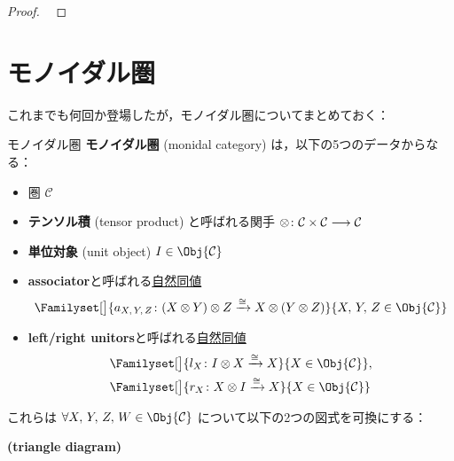 \documentclass[TQFT_main]{subfiles}
\begin{document}
    \begin{proof}
        ~\cite[Proposition 2.1, p.5]{Mueger1998}
    \end{proof}

    \section{モノイダル圏}

    これまでも何回か登場したが，モノイダル圏についてまとめておく：

    \begin{mydef}[label=redef:monoidal-category,breakable]{モノイダル圏}
        \textbf{モノイダル圏} (monidal category) は，以下の5つのデータからなる：
        \begin{itemize}
            \item 圏 $\mathcal{C}$
            \item \textbf{テンソル積} (tensor product) と呼ばれる関手 $\otimes \colon \mathcal{C} \times \mathcal{C} \longrightarrow \mathcal{C}$
            \item \textbf{単位対象} (unit object) $I \in \Obj{\mathcal{C}}$
            \item \textbf{associator}と呼ばれる\hyperref[def:nat]{自然同値}
            \begin{align}
                \Familyset[\big]{a_{X,\, Y,\, Z} \colon (X \otimes Y) \otimes Z \xrightarrow{\cong} X \otimes (Y \otimes Z)}{X,\, Y,\, Z \in \Obj{\mathcal{C}}}
            \end{align}
            \item \textbf{left/right unitors}と呼ばれる\hyperref[def:nat]{自然同値}
            \begin{align}
                &\Familyset[\big]{l_X \colon I \otimes X \xrightarrow{\cong} X}{X \in \Obj{\mathcal{C}}}, \\
                &\Familyset[\big]{r_X \colon X \otimes I \xrightarrow{\cong} X}{X \in \Obj{\mathcal{C}}}
            \end{align}
            
        \end{itemize}
        これらは $\forall X,\, Y,\, Z,\, W \in \Obj{\mathcal{C}}$ について以下の2つの図式を可換にする：
        \begin{description}
            \item[\textbf{(triangle diagram)}]　
            
            \begin{center}
            \end{center}
            

\end{description}
\end{mydef}
\end{document}
